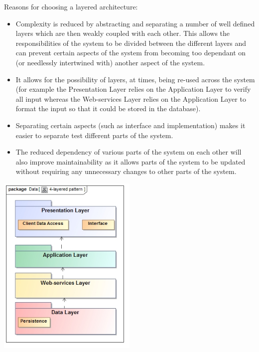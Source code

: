 \documentclass[hidelinks,a4paper,12pt]{article}
\begin{document}
\begin{enumerate}
		Reasons for choosing a layered architecture:
		\begin{itemize}
			\item Complexity is reduced by abstracting and separating a number of well defined layers which are then weakly coupled with each other. This allows the responsibilities of the system to be divided between the different layers and can prevent certain aspects of the system from becoming too dependant on (or needlessly intertwined with) another aspect of the system.
			\item It allows for the possibility of layers, at times, being re-used across the system (for example the Presentation Layer relies on the Application Layer to verify all input whereas the Web-services Layer relies on the Application Layer to format the input so that it could be stored in the database).
			\item Separating certain aspects (such as interface and implementation) makes it easier to separate test different parts of the system.
			\item The reduced dependency of various parts of the system on each other will also improve maintainability as it allows parts of the system to be updated without requiring any unnecessary changes to other parts of the system.
		\end{itemize}
		\begin{center}
  	 		\includegraphics[width=0.5\textwidth] {./4-layered-pattern.jpg}\\[0.4cm]
		\end{center}
	\end{enumerate}
	
\end{document}
